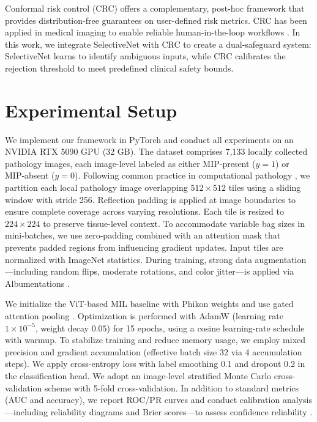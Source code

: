 \documentclass[sigconf,review,anonymous]{acmart}
\theoremstyle{remark}
\begin{document}
Conformal risk control (CRC) \cite{angelopoulos2022conformal} offers a complementary, post-hoc framework that provides distribution-free guarantees on user-defined risk metrics. CRC has been applied in medical imaging to enable reliable human-in-the-loop workflows \cite{dvijotham2023enhancing, dai2017tumor}. In this work, we integrate SelectiveNet with CRC to create a dual-safeguard system: SelectiveNet learns to identify ambiguous inputs, while CRC calibrates the rejection threshold to meet predefined clinical safety bounds.

\section{Experimental Setup}\label{S7}

We implement our framework in PyTorch and conduct all experiments on an NVIDIA RTX 5090 GPU (32 GB). The dataset comprises 7,133 locally collected pathology images, each image-level labeled as either MIP‑present ($y = 1$) or MIP‑absent ($y = 0$). Following common practice in computational pathology \cite{campanella2019clinical,lu2021data}, we partition each local pathology image overlapping $512\times512$ tiles using a sliding window with stride 256. Reflection padding is applied at image boundaries to ensure complete coverage across varying resolutions. Each tile is resized to $224\times224$ to preserve tissue-level context. To accommodate variable bag sizes in mini‑batches, we use zero‑padding combined with an attention mask that prevents padded regions from influencing gradient updates. Input tiles are normalized with ImageNet statistics. During training, strong data augmentation---including random flips, moderate rotations, and color jitter---is applied via Albumentations \cite{buslaev2020albumentations}.

We initialize the ViT-based MIL baseline with Phikon weights \cite{filiot2023scaling} and use gated attention pooling \cite{ilse2018attention}. Optimization is performed with AdamW \cite{loshchilov2017decoupled} (learning rate $1\times10^{-5}$, weight decay $0.05$) for 15 epochs, using a cosine learning-rate schedule with warmup. To stabilize training and reduce memory usage, we employ mixed precision \cite{micikevicius2017mixed} and gradient accumulation (effective batch size 32 via 4 accumulation steps).
We apply cross-entropy loss with label smoothing 0.1 \cite{szegedy2016rethinking} and dropout 0.2 in the classification head. We adopt an image-level stratified Monte Carlo cross-validation scheme with 5-fold cross-validation. In addition to standard metrics (AUC and accuracy), we report ROC/PR curves and conduct calibration analysis---including reliability diagrams and Brier scores---to assess confidence reliability \cite{guo2017calibration}.
\end{document}
